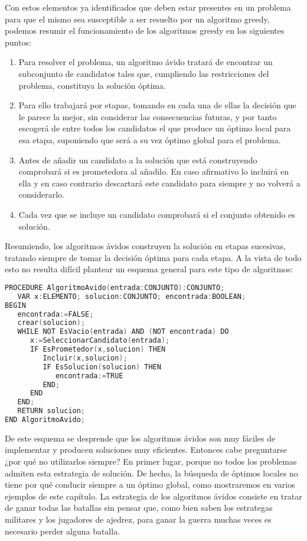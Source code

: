 Con estos elementos ya identificados que deben estar presentes en un problema para que el mismo sea susceptible a ser resuelto por un algoritmo greedy, podemos resumir el funcionamiento de los algoritmos
greedy en los siguientes puntos:

\begin{enumerate}
	\item Para resolver el problema, un algoritmo ávido tratará de encontrar un
	subconjunto de candidatos tales que, cumpliendo las restricciones del problema,
	constituya la solución óptima.
	\item Para ello trabajará por etapas, tomando en cada una de ellas la decisión que le
	parece la mejor, sin considerar las consecuencias futuras, y por tanto escogerá de entre todos los candidatos el que produce un óptimo local para esa etapa,
suponiendo que será a su vez óptimo global para el problema.
	\item Antes de añadir un candidato a la solución que está construyendo comprobará si es prometedora al añadilo. En caso afirmativo lo incluirá en ella y en caso
contrario descartará este candidato para siempre y no volverá a considerarlo.
	\item Cada vez que se incluye un candidato comprobará si el conjunto obtenido es
solución.
\end{enumerate}

Resumiendo, los algoritmos ávidos construyen la solución en etapas sucesivas, tratando siempre de tomar la decisión óptima para cada etapa. A la vista de todo esto no resulta difícil plantear un esquema general para este tipo de algoritmos:

\begin{lstlisting}[language=C++]
PROCEDURE AlgoritmoAvido(entrada:CONJUNTO):CONJUNTO;
   VAR x:ELEMENTO; solucion:CONJUNTO; encontrada:BOOLEAN;
BEGIN
   encontrada:=FALSE; 
   crear(solucion);
   WHILE NOT EsVacio(entrada) AND (NOT encontrada) DO
      x:=SeleccionarCandidato(entrada);
      IF EsPrometedor(x,solucion) THEN
         Incluir(x,solucion);
         IF EsSolucion(solucion) THEN
            encontrada:=TRUE
         END;
      END
   END;
   RETURN solucion;
END AlgoritmoAvido;
\end{lstlisting}

De este esquema se desprende que los algoritmos ávidos son muy fáciles de implementar y producen soluciones muy eficientes. Entonces cabe preguntarse ¿por qué no utilizarlos siempre? En primer lugar, porque no todos los problemas admiten esta estrategia de solución. De hecho, la búsqueda de óptimos locales no tiene por qué conducir siempre a un óptimo global, como mostraremos en varios ejemplos de este capítulo. La estrategia de los algoritmos ávidos consiste en tratar de ganar todas las batallas sin pensar que, como bien saben los estrategas militares y los jugadores de ajedrez, para ganar la guerra muchas veces es necesario perder alguna batalla.


